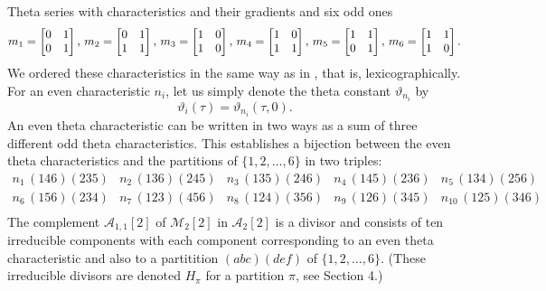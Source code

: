 \documentclass[12pt]{amsart}
\numberwithin{equation}{section}
\numberwithin{equation}{section}
\theoremstyle{definition}
\theoremstyle{remark}
\begin{document}
\begin{section}{Theta series with characteristics and their gradients}
and six odd ones
\[
m_1=\left[\begin{matrix} 0 & 1 \cr 0 & 1 \cr\end{matrix}\right], \,
m_2=\left[\begin{matrix} 0 & 1 \cr 1 & 1 \cr\end{matrix}\right], \,
m_3=\left[\begin{matrix} 1 & 0 \cr 1 & 0 \cr\end{matrix}\right], \,
m_4=\left[\begin{matrix} 1 & 0 \cr 1 & 1 \cr\end{matrix}\right], \,
m_5=\left[\begin{matrix} 1 & 1 \cr 0 & 1 \cr\end{matrix}\right], \,
m_6=\left[\begin{matrix} 1 & 1 \cr 1 & 0 \cr\end{matrix}\right].
\]
We ordered these characteristics in the same way 
as in \cite[Section 3]{CvdGG}, that is, lexicographically.
For an even characteristic $n_i$, let us simply denote the theta constant
$\vartheta_{n_i}$ by
\[
\vartheta_i(\tau)=\vartheta_{n_i}(\tau,0).
\]
An even theta characteristic can be written in two ways as a sum of three different odd theta
characteristics. This establishes a bijection between the even theta characteristics and the
partitions of $\{1,2,\ldots,6\}$ in two triples:
$$
\begin{matrix}
n_1 \, (146)(235) & n_2 \, (136)(245) & n_3 \, (135)(246) & n_4 \, (145)(236) & n_5 \, (134)(256)\\
n_6 \, (156)(234) & n_7 \, (123)(456) & n_8 \, (124)(356) & n_9 \, (126)(345) & n_{10} \, (125)(346)\\
\end{matrix}
$$
The complement $\mathcal{A}_{1,1}[2]$ of $\mathcal{M}_2[2]$ in $\mathcal{A}_2[2]$ is a divisor and consists of ten
irreducible components with each component corresponding to an even theta characteristic and also to a
partitition $(abc)(def)$ of $\{1,2,\ldots,6\}$. (These irreducible divisors are denoted $H_{\pi}$ for a partition $\pi$, see
Section 4.)


\end{section}
\end{document}

